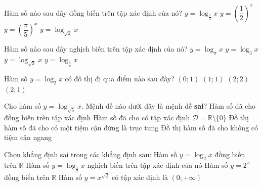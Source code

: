 \begin{ex}%
	Hàm số nào sau đây đồng biến trên tập  xác định của nó?
	 \choice
		 {$y=\log _{\frac{1}{3}} x$}
		{$y=\left(\dfrac{1}{2}\right)^x$} 
		{$y=\left(\dfrac{\pi}{5}\right)^x$} 
		{\True $y=\log  _{\sqrt{2}} x$}
\end{ex}

\begin{ex}%
	Hàm số nào  sau đây nghịch biến trên tập xác định của nó?
	 \choice
		{$y=\log_\pi x$} 
		 {$y=\log_3x$}
		{$y=\log_{\sqrt{3}}x$} 
		 {\True $y=\log_{\frac{1}{\mathrm{e}}}x$}
\end{ex}

\begin{ex}%
	Hàm số $y=\log_2x$ có đồ thị đi qua điểm  nào sau đây?
	 \choice
		 {$(0;1)$}
		 {$(1;1)$}
		 {$(2;2)$}
		{\True $(2;1)$} 
\end{ex}

\begin{ex}%
	Cho hàm số $y=\log_{\sqrt{5}}x$. Mệnh đề  nào dưới đây là mệnh đề \textbf{sai}?
	 \choice
		{Hàm số  đã cho đồng biến trên tập xác định}
		{\True Hàm số đã cho  có tập xác định $\mathscr{D}=\mathbb{R} \setminus \{0\}$}
		{Đồ  thị hàm số đã cho có một tiệm cận đứng là trục tung}
		{Đồ thị hàm số đã cho không có tiệm  cận ngang}
\end{ex}

\begin{ex}%
	 Chọn khẳng định sai trong các khẳng định sau:
	 \choice
		{\True Hàm số $y=\log_2 x$ đồng biến trên $\mathbb{R}$} 
		{Hàm số $y=\log _{\tfrac{1}{2}} x$ nghịch biến trên tập xác định của  nó}
		{Hàm số $y=2^x$  đồng biến trên $\mathbb{R}$}
		{Hàm số $y=x^{\sqrt{2}}$ có tập xác định  là $\left(0;+\infty \right)$}
\end{ex}

